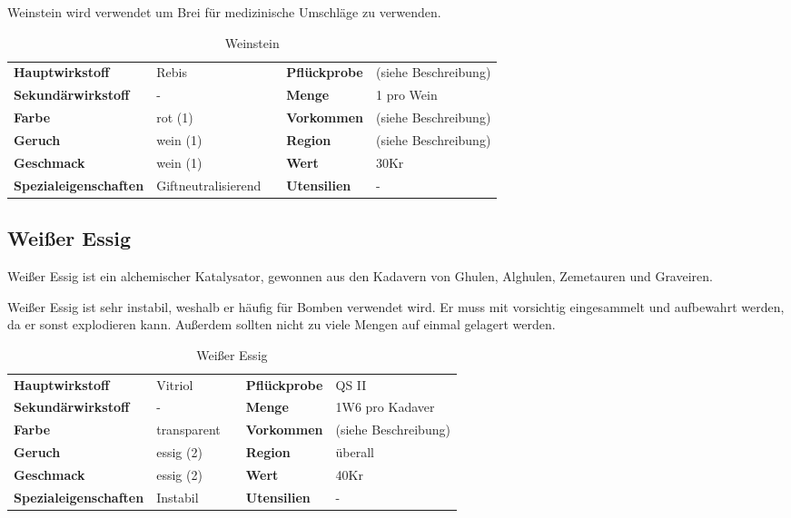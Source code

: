 Weinstein wird verwendet um Brei für medizinische Umschläge zu verwenden.

\begin{table}[H] 
\begin{center} 
\begin{tabular}{|l|l|p{1cm}|l|l|} 
  	\cline{1-2} \cline{4-5} 
  	\textbf{Hauptwirkstoff} & Rebis && \textbf{Pflückprobe} & (siehe Beschreibung) \\ \cline{1-2} \cline{4-5} 
  	\textbf{Sekundärwirkstoff} & - && \textbf{Menge} & 1 pro Wein \\ \cline{1-2} \cline{4-5} 
  	\textbf{Farbe} & rot (1) && \textbf{Vorkommen} & (siehe Beschreibung) \\ \cline{1-2} \cline{4-5} 
  	\textbf{Geruch} & wein (1) && \textbf{Region} & (siehe Beschreibung) \\ \cline{1-2} \cline{4-5} 
  	\textbf{Geschmack} & wein (1) && \textbf{Wert} & 30Kr \\ \cline{1-2} \cline{4-5} 
  	\textbf{Spezialeigenschaften} & Giftneutralisierend && \textbf{Utensilien} & - \\ \cline{1-2} \cline{4-5} 
\end{tabular} 
\end{center} 
\caption{Weinstein} 
\label{tab:weinstein} 
\end{table}


\subsection{Weißer Essig}
Weißer Essig ist ein alchemischer Katalysator, gewonnen aus den Kadavern von Ghulen, Alghulen, Zemetauren und Graveiren. 

Weißer Essig ist sehr instabil, weshalb er häufig für Bomben verwendet wird. Er muss mit vorsichtig eingesammelt und aufbewahrt werden, da er sonst explodieren kann. Außerdem sollten nicht zu viele Mengen auf einmal gelagert werden.

\begin{table}[H] 
\begin{center} 
\begin{tabular}{|l|l|p{1cm}|l|l|} 
  	\cline{1-2} \cline{4-5} 
  	\textbf{Hauptwirkstoff} & Vitriol && \textbf{Pflückprobe} & QS II \\ \cline{1-2} \cline{4-5} 
  	\textbf{Sekundärwirkstoff} & - && \textbf{Menge} & 1W6 pro Kadaver \\ \cline{1-2} \cline{4-5} 
  	\textbf{Farbe} & transparent && \textbf{Vorkommen} & (siehe Beschreibung) \\ \cline{1-2} \cline{4-5} 
  	\textbf{Geruch} & essig (2) && \textbf{Region} & überall \\ \cline{1-2} \cline{4-5} 
  	\textbf{Geschmack} & essig (2) && \textbf{Wert} & 40Kr \\ \cline{1-2} \cline{4-5} 
  	\textbf{Spezialeigenschaften} & Instabil && \textbf{Utensilien} & - \\ \cline{1-2} \cline{4-5} 
\end{tabular} 
\end{center} 
\caption{Weißer Essig} 
\label{tab:weisser_essig} 
\end{table}



